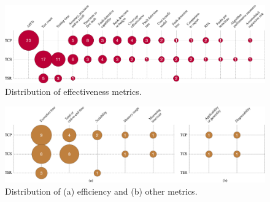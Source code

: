 \newcommand{\rowmetric}[6]{
#1 & %
\textcolor{olive}{#2} & %
\textcolor{teal}{#3} & %
\textcolor{brown}{#4} & %
\textcolor{purple}{#5} & %
#6 %
\\}

\begin{figure}
  \center
  \includegraphics[width=\linewidth]{figures/effectiveness_metrics.png}
  \caption{Distribution of effectiveness metrics.}
  \label{fig:effectiveness_metrics}
\end{figure}

\begin{figure}
  \center
  \includegraphics[width=\linewidth]{figures/efficiency_other_metrics.png}
  \caption{Distribution of (a) efficiency and (b) other metrics.}
  \label{fig:efficiency_metrics}
\end{figure}

